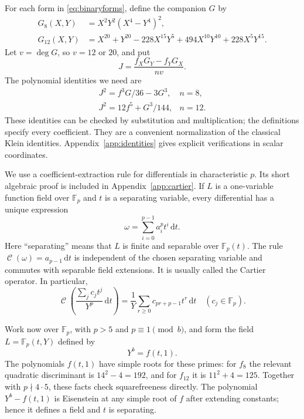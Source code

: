 \documentclass[11pt]{article}
\numberwithin{equation}{section}
\theoremstyle{definition}
\theoremstyle{remark}
\newcommand{\Fp}{\mathbb F_p}
\newcommand{\dd}{\,\mathrm d}
\DeclareMathOperator{\Cart}{\mathcal C}
\begin{document}
For each form in \eqref{eq:binaryforms}, define the companion $G$ by
\begin{equation}\label{eq:companions}
 \begin{aligned}
 G_8(X,Y)&=X^2Y^2(X^4-Y^4)^2,\\
 G_{12}(X,Y)&=X^{20}+Y^{20}-228X^{15}Y^5
                  +494X^{10}Y^{10}+228X^5Y^{15}.
 \end{aligned}
\end{equation}
Let $v=\deg G$, so $v=12$ or $20$, and put
\[
 J=\frac{f_XG_Y-f_YG_X}{nv}.
\]
The polynomial identities we need are
\begin{equation}\label{eq:kleinrelations}
 \begin{array}{ll}
 J^2=f^3G/36-3G^3,&n=8,\\
 J^2=12f^5+G^3/144,&n=12.
 \end{array}
\end{equation}
These identities can be checked by substitution and multiplication;
the definitions specify every coefficient. They are a convenient
normalization of the classical Klein identities. Appendix~\ref{app:identities}
gives explicit verifications in scalar coordinates.

We use a coefficient-extraction rule for differentials in characteristic
$p$. Its short algebraic proof is included in
Appendix~\ref{app:cartier}. If $L$ is a one-variable function field over
$\Fp$ and $t$ is a separating variable, every differential has a unique
expression
\[
 \omega=\sum_{i=0}^{p-1}a_i^p t^i\dd t.
\]
Here ``separating'' means that $L$ is finite and separable over $\Fp(t)$.
The rule $\Cart(\omega)=a_{p-1}\dd t$ is independent of the chosen
separating variable and commutes with separable field extensions.
It is usually called the Cartier operator. In particular,
\begin{equation}\label{eq:cartierrule}
 \Cart\left(\frac{\sum_jc_jt^j}{Y^p}\dd t\right)
 =\frac1Y\sum_{r\geq0}c_{pr+p-1}t^r\dd t
 \quad(c_j\in\Fp).
\end{equation}

Work now over $\Fp$, with $p>5$ and $p\equiv1\pmod b$, and form
the field $L=\Fp(t,Y)$ defined by
\[
 Y^b=f(t,1).
\]
The polynomials $f(t,1)$ have simple roots for these primes: for $f_8$
the relevant quadratic discriminant is $14^2-4=192$, and for $f_{12}$
it is $11^2+4=125$. Together with $p\nmid4\cdot5$, these facts check
squarefreeness directly. The polynomial $Y^b-f(t,1)$ is Eisenstein at
any simple root of $f$ after extending constants; hence it defines a
field and $t$ is separating.
\end{document}
